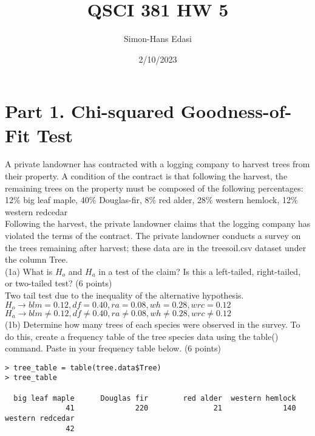 \documentclass{article}
\title{QSCI 381 HW 5}
\date{2/10/2023}
\author{Simon-Hans Edasi}
\begin{document}
	\maketitle




\section{Part 1. Chi-squared Goodness-of-Fit Test}

A private landowner has contracted with a logging company to harvest trees from their property. A condition of the contract is that following the harvest, the remaining trees on the property must be composed of the following percentages:\\
 

12\% big leaf maple, 40\% Douglas-fir, 8\% red alder, 28\% western hemlock, 12\% western redcedar\\

 

Following the harvest, the private landowner claims that the logging company has violated the terms of the contract. The private landowner conducts a survey on the trees remaining after harvest; these data are in the treesoil.csv dataset under the column Tree.\\

 

(1a) What is $H_{o}$ and $H_{a}$ in a test of the claim? Is this a left-tailed, right-tailed, or two-tailed test? (6 points)\\

Two tail test due to the inequality of the alternative hypothesis.\\
$H_{o} \rightarrow blm = 0.12, df = 0.40, ra = 0.08, wh = 0.28, wrc = 0.12$\\
$H_{a} \rightarrow blm \neq 0.12, df \neq 0.40, ra \neq 0.08, wh \neq 0.28, wrc \neq 0.12$\\

(1b) Determine how many trees of each species were observed in the survey. To do this, create a frequency table of the tree species data using the table() command. Paste in your frequency table below. (6 points)\\
\begin{center}
\begin{lstlisting}
> tree_table = table(tree.data$Tree)
> tree_table

  big leaf maple      Douglas fir        red alder  western hemlock 
              41              220               21              140 
western redcedar 
              42 
\end{lstlisting}	
\end{center}
\end{document}
